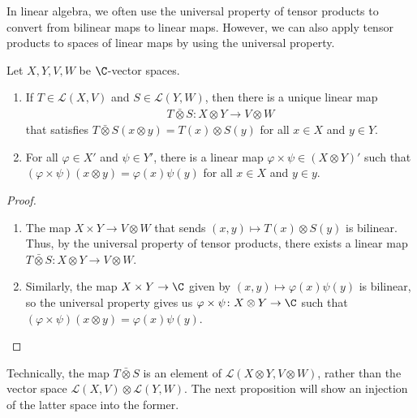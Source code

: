 In linear algebra, we often use the universal property of tensor products to convert from bilinear maps to linear maps. However, we can also apply tensor products to spaces of linear maps by using the universal property.
\begin{proposition}
  Let $X,Y,V,W$ be $\C$-vector spaces.
  \begin{enumerate}[(1)]
    \item If $T\in \mathcal{L}\left( X,V \right)$ and $S\in \mathcal{L}\left( Y,W \right)$, then there is a unique linear map
      \begin{align*}
        T\bar{\otimes} S \colon X\otimes Y \rightarrow V\otimes W
      \end{align*}
      that satisfies $T\bar{\otimes} S\left( x\otimes y \right) = T\left( x \right)\otimes S\left( y \right)$ for all $x\in X$ and $y\in Y$.
    \item For all $\varphi\in X'$ and $\psi\in Y'$, there is a linear map $\varphi\times\psi \in \left( X\otimes Y \right)'$ such that $\left( \varphi\times\psi \right)\left( x\otimes y \right) = \varphi\left( x \right)\psi\left( y \right)$ for all $x\in X$ and $y\in y$.
  \end{enumerate}
\end{proposition}
\begin{proof}\hfill
  \begin{enumerate}[(1)]
    \item The map $X\times Y \rightarrow V\otimes W$ that sends $\left( x,y \right)\mapsto T\left( x \right)\otimes S\left( y \right)$ is bilinear. Thus, by the universal property of tensor products, there exists a linear map $T \bar{\otimes} S \colon X\otimes Y \rightarrow V\otimes W$.
    \item Similarly, the map $X\times Y \rightarrow \C$ given by $\left( x,y \right)\mapsto \varphi(x)\psi(y)$ is bilinear, so the universal property gives us $\varphi\times\psi\colon X\otimes Y \rightarrow \C$ such that $\left( \varphi\times \psi \right)\left( x\otimes y \right) = \varphi\left( x \right)\psi\left( y \right)$.
  \end{enumerate}
\end{proof}
\begin{remark}
Technically, the map $T\bar{\otimes} S$ is an element of $\mathcal{L}\left( X\otimes Y,V\otimes W \right)$, rather than the vector space $\mathcal{L}\left( X,V \right)\otimes \mathcal{L}\left( Y,W \right)$. The next proposition will show an injection of the latter space into the former.
\end{remark}
